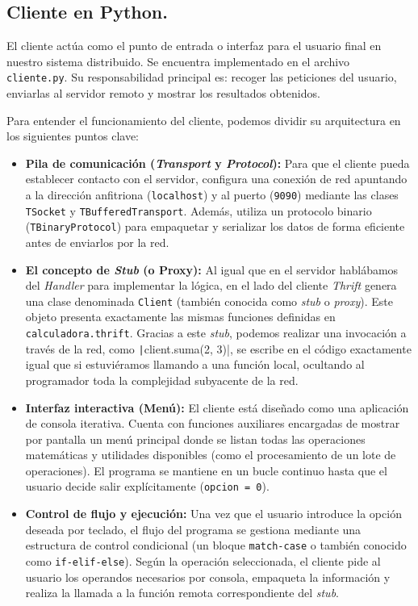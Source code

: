 \documentclass[a4paper,12pt]{article}
\begin{document}
		\subsection{Cliente en Python.}
		El cliente actúa como el punto de entrada o interfaz para el usuario final en nuestro sistema distribuido. Se encuentra implementado en el archivo \texttt{cliente.py}. Su responsabilidad principal es: recoger las peticiones del usuario, enviarlas al servidor remoto y mostrar los resultados obtenidos.
		
		Para entender el funcionamiento del cliente, podemos dividir su arquitectura en los siguientes puntos clave:
		
		\begin{itemize}
			\item \textbf{Pila de comunicación (\textit{Transport} y \textit{Protocol}):} Para que el cliente pueda establecer contacto con el servidor, configura una conexión de red apuntando a la dirección anfitriona (\texttt{localhost}) y al puerto (\texttt{9090}) mediante las clases \texttt{TSocket} y \texttt{TBufferedTransport}. Además, utiliza un protocolo binario (\texttt{TBinaryProtocol}) para empaquetar y serializar los datos de forma eficiente antes de enviarlos por la red.
			
			\item \textbf{El concepto de \textit{Stub} (o Proxy):} Al igual que en el servidor hablábamos del \textit{Handler} para implementar la lógica, en el lado del cliente \textit{Thrift} genera una clase denominada \texttt{Client} (también conocida como \textit{stub} o \textit{proxy}). Este objeto presenta exactamente las mismas funciones definidas en \texttt{calculadora.thrift}. Gracias a este \textit{stub}, podemos realizar una invocación a través de la red, como \texttt|client.suma(2, 3)|, se escribe en el código exactamente igual que si estuviéramos llamando a una función local, ocultando al programador toda la complejidad subyacente de la red.
			
			\item \textbf{Interfaz interactiva (Menú):} El cliente está diseñado como una aplicación de consola iterativa. Cuenta con funciones auxiliares encargadas de mostrar por pantalla un menú principal donde se listan todas las operaciones matemáticas y utilidades disponibles (como el procesamiento de un lote de operaciones). El programa se mantiene en un bucle continuo hasta que el usuario decide salir explícitamente (\texttt{opcion = 0}).
			
			\item \textbf{Control de flujo y ejecución:} Una vez que el usuario introduce la opción deseada por teclado, el flujo del programa se gestiona mediante una estructura de control condicional (un bloque \texttt{match-case} o también conocido como \texttt{if-elif-else}). Según la operación seleccionada, el cliente pide al usuario los operandos necesarios por consola, empaqueta la información y realiza la llamada a la función remota correspondiente del \textit{stub}.
			

\end{itemize}
\end{document}
